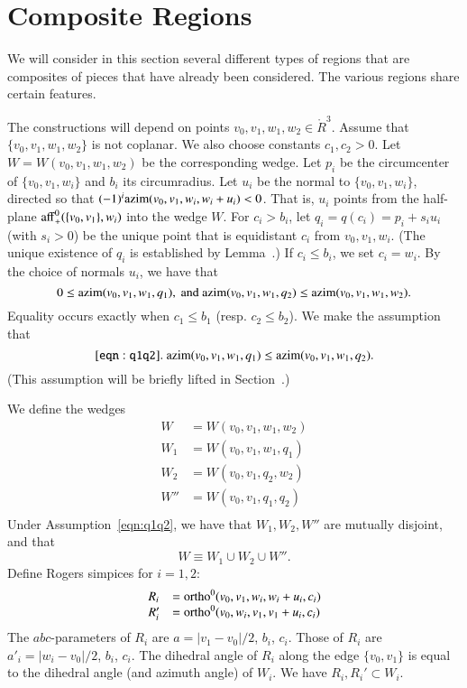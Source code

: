 \section{Composite Regions}

We will consider in this section several different types
of regions that are composites of pieces that have already been
considered.  The various regions share certain features.

The constructions will depend on points
 $v_0,v_1,w_1,w_2\in\ring{R}^3$. Assume that $\{v_0,v_1,w_1,w_2\}$
is not coplanar.  We also choose constants $c_1,c_2>0$.
Let
$W=W(v_0,v_1,w_1,w_2)$ be the corresponding wedge.  
Let $p_i$ be the circumcenter of
$\{v_0,v_1,w_i\}$ and $b_i$ its circumradius.
Let $u_i$ be the normal to $\{v_0,v_1,w_i\}$, directed so that
$(-1)^i{\operatorname{azim}}(v_0,v_1,w_i,w_i+u_i) < 0$.  That is, $u_i$ points
from the half-plane ${\operatorname{aff}}_+^0(\{v_0,v_1\},w_i)$ into the wedge $W$.
For $c_i > b_i$, let $q_i = q(c_i) = p_i + s_i u_i$ (with $s_i>0$) be the
unique point that is equidistant $c_i$ from $v_0,v_1,w_i$.
(The unique existence of $q_i$ is established by Lemma~.)
If $c_i\le b_i$, we set $c_i=w_i$.
By the choice of normals $u_i$, we have that
 $$
 0\le {\operatorname{azim}}(v_0,v_1,w_1,q_1), \text{ and }
 {\operatorname{azim}}(v_0,v_1,w_1,q_2) \le {\operatorname{azim}}(v_0,v_1,w_1,w_2).
 $$
Equality occurs exactly when $c_1\le b_1$ (resp. $c_2\le b_2$).
We make the assumption that
\begin{equation}\tlabel{eqn:q1q2}
\op{azim}(v_0,v_1,w_1,q_1) \le \op{azim}(v_0,v_1,w_1,q_2).
\end{equation}
(This assumption will be briefly lifted in Section~.)

We define the wedges 
$$
   \begin{array}{lll}
   W &= W(v_0,v_1,w_1,w_2)\\
   W_1 &= W(v_0,v_1,w_1,q_1)\\
   W_2 &= W(v_0,v_1,q_2,w_2)\\
   W'' &= W(v_0,v_1,q_1,q_2)\\
   \end{array}
$$
Under Assumption~\ref{eqn:q1q2}, we have that
$W_1,W_2,W''$ are mutually disjoint, and that
   $$
   W \equiv W_1 \cup W_2 \cup W''.
   $$
Define Rogers simpices for $i=1,2$:
  $$
  \begin{array}{lll}
  R_i &= {\operatorname{ortho}}^0(v_0,v_1,w_i,w_i+u_i,c_i)\\
  R_i'&= {\operatorname{ortho}}^0(v_0,w_i,v_1,v_1+u_i,c_i)\\
  \end{array}
  $$
The $abc$-parameters of $R_i$ are $a=|v_1-v_0|/2$, $b_i$, $c_i$.
Those of $R_i$ are $a'_i=|w_i-v_0|/2$, $b_i$, $c_i$.
The dihedral angle of $R_i$ along the edge $\{v_0,v_1\}$ is
equal to the dihedral angle (and azimuth angle) of $W_i$.
We have $R_i,R_i'\subset W_i$.

